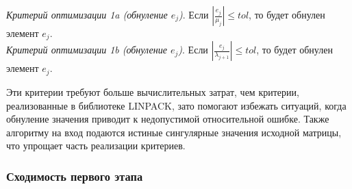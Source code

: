 \noindent\textit{Критерий оптимизации 1a (обнуление $e_j$)}. Если $|\frac{e_j}{\mu_j}|\leq tol$, то будет обнулен элемент $e_j$.\vspace{1em}
\\\textit{Критерий оптимизации 1b (обнуление $e_j$)}. Если $|\frac{e_j}{\lambda_{j+1}}|\leq tol$, то будет обнулен элемент $e_j$.\vspace{1em}

Эти критерии требуют больше вычислительных затрат, чем критерии, реализованные в библиотеке LINPACK, зато помогают избежать ситуаций, когда обнуление значения приводит к недопустимой относительной ошибке. Также алгоритму на вход подаются истиные сингулярные значения исходной матрицы, что упрощает часть реализации критериев.



\subsubsection{Сходимость первого этапа}

